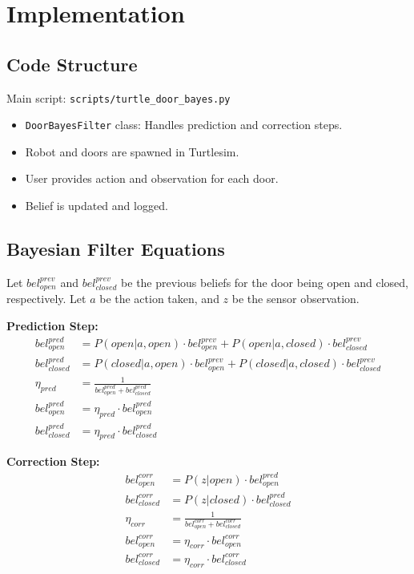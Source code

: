\documentclass[12pt]{article}
\begin{document}
\section{Implementation}
\subsection{Code Structure}
Main script: \texttt{scripts/turtle_door_bayes.py}
\begin{itemize}
  \item \texttt{DoorBayesFilter} class: Handles prediction and correction steps.
  \item Robot and doors are spawned in Turtlesim.
  \item User provides action and observation for each door.
  \item Belief is updated and logged.
\end{itemize}
\subsection{Bayesian Filter Equations}
Let $bel_{open}^{prev}$ and $bel_{closed}^{prev}$ be the previous beliefs for the door being open and closed, respectively. Let $a$ be the action taken, and $z$ be the sensor observation.

\textbf{Prediction Step:}
\begin{equation}
\begin{aligned}
bel_{open}^{pred} &= P(open|a,open) \cdot bel_{open}^{prev} + P(open|a,closed) \cdot bel_{closed}^{prev} \\
bel_{closed}^{pred} &= P(closed|a,open) \cdot bel_{open}^{prev} + P(closed|a,closed) \cdot bel_{closed}^{prev} \\
\eta_{pred} &= \frac{1}{bel_{open}^{pred} + bel_{closed}^{pred}} \\
bel_{open}^{pred} &= \eta_{pred} \cdot bel_{open}^{pred} \\
bel_{closed}^{pred} &= \eta_{pred} \cdot bel_{closed}^{pred}
\end{aligned}
\end{equation}

\textbf{Correction Step:}
\begin{equation}
\begin{aligned}
bel_{open}^{corr} &= P(z|open) \cdot bel_{open}^{pred} \\
bel_{closed}^{corr} &= P(z|closed) \cdot bel_{closed}^{pred} \\
\eta_{corr} &= \frac{1}{bel_{open}^{corr} + bel_{closed}^{corr}} \\
bel_{open}^{corr} &= \eta_{corr} \cdot bel_{open}^{corr} \\
bel_{closed}^{corr} &= \eta_{corr} \cdot bel_{closed}^{corr}
\end{aligned}
\end{equation}
\end{document}
